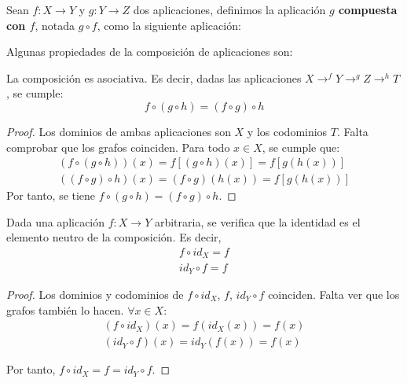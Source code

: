 \begin{definicion}[Composición]
    Sean $f:X\rightarrow Y$ y $g:Y \rightarrow Z$ dos aplicaciones, definimos la aplicación \textbf{$g$ compuesta con $f$}, notada $g \circ f$, como la siguiente aplicación:
\end{definicion}

Algunas propiedades de la composición de aplicaciones son:
\begin{prop}\label{prop:CompAsoc}
    La composición es asociativa. Es decir, dadas las aplicaciones $\displaystyle X \mathop{\longrightarrow}^{f} Y \mathop{\longrightarrow}^{g} Z \mathop{\longrightarrow}^{h} T$, se cumple:
    $$f \circ (g \circ h) = (f \circ g) \circ h$$
\end{prop}
\begin{proof}
    Los dominios de ambas aplicaciones son $X$ y los codominios $T$. Falta comprobar que los grafos coinciden. Para todo $x \in X$, se cumple que:
    \begin{gather*}
        (f \circ (g \circ h))(x) = f[(g\circ h)(x)] = f[g(h(x))]\\
        ((f \circ g) \circ h)(x) = (f\circ g)(h(x)) = f[g(h(x))]
    \end{gather*}
    Por tanto, se tiene $f \circ (g \circ h) = (f \circ g) \circ h$.
\end{proof}

\begin{prop}
    Dada una aplicación $f:X \rightarrow Y$ arbitraria, se verifica que la identidad es el elemento neutro de la composición. Es decir,
    \begin{gather*}
        f \circ id_X = f\\
        id_Y \circ f = f
    \end{gather*}
\end{prop}
\begin{proof}
    Los dominios y codominios de $f \circ id_X$, $f$, $id_Y \circ f$ coinciden. Falta ver que los grafos también lo hacen. $\forall x \in X$:
    \begin{gather*}
        (f \circ id_X)(x) = f(id_X(x)) = f(x) \\
        (id_Y \circ f)(x) = id_Y(f(x)) = f(x)
    \end{gather*}

    Por tanto, $f \circ id_X = f = id_Y \circ f$.
\end{proof}

